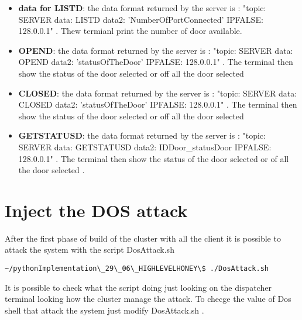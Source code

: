 \begin{itemize}
\item \textbf{data for LISTD}: the data format returned by the server is : "topic: SERVER data: LISTD data2: 'NumberOfPortConnected' IPFALSE: 128.0.0.1" . Thew termianl print the number of door available.
\item \textbf{OPEND}: the data format returned by the server is : "topic: SERVER data: OPEND data2: 'statusOfTheDoor' IPFALSE: 128.0.0.1" . The terminal then show the status of the door selected or off all the door selected
\item \textbf{CLOSED}: the data format returned by the server is : "topic: SERVER data: CLOSED data2: 'statusOfTheDoor' IPFALSE: 128.0.0.1" . The terminal then show the status of the door selected or off all the door selected
\item \textbf{GETSTATUSD}:  the data format returned by the server is : "topic: SERVER data: GETSTATUSD data2: IDDoor\_statusDoor IPFALSE: 128.0.0.1" . The terminal then show the status of the door selected or of all the door selected .
\end{itemize}
\section{Inject the DOS attack}
After the first phase of build of the cluster with all the client it is possible to attack the system with the script DosAttack.sh \begin{verbatim}~/pythonImplementation\_29\_06\_HIGHLEVELHONEY\$ ./DosAttack.sh\end{verbatim}
It is possible to check what the script doing just looking on the dispatcher terminal looking how the cluster manage the attack. To checge the value of Dos shell that attack the system just modify  DosAttack.sh . 

